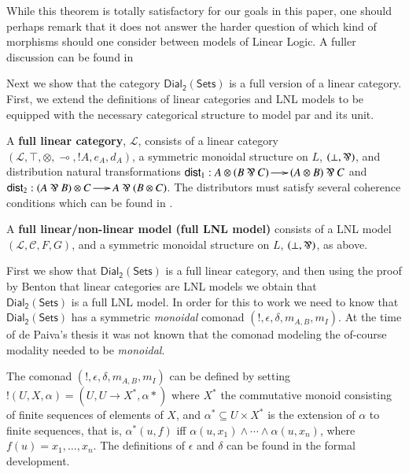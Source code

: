 \documentclass[preprint,12pt]{elsarticle}
\newcommand{\cat}[1]{\mathcal{#1}}
\newcommand{\limp}[0]{\multimap}
\newcommand{\dial}[0]{\mathsf{Dial_2}(\mathsf{Sets})}
\begin{document}
While this theorem is totally satisfactory for our goals in this paper, one should perhaps remark that it does not answer the harder question of which kind of morphisms should one consider between models of Linear Logic. A fuller discussion can be found in %
\iffalse
@article{Maietti:2005,
  title={Relating categorical semantics for intuitionistic linear logic},
  author={Maietti, Maria Emilia and Maneggia, Paola and De Paiva, Valeria and Ritter, Eike},
  journal={Applied Categorical Structures},
  volume={13},
  number={1},
  pages={1--36},
  year={2005},
  publisher={Kluwer Academic Publishers}
}
\fi

Next we show that the category $\dial$ is a full version of a linear
category. First, we extend the definitions of linear categories and
LNL models to be equipped with the necessary categorical structure to
model par and its unit.
\begin{definition}
  \label{def:full-linear-cat}
  A \textbf{full linear category}, $\mathcal{L}$, consists of a linear
  category \\$(\mathcal{L}, \top, \otimes, \limp,!A,e_A,d_A)$, a
  symmetric monoidal structure on $L$, $(\perp, \parr)$, and
  distribution natural transformations $\mathsf{dist}_1 : A \otimes (B
  \parr C) \to (A \otimes B) \parr C$ and $\mathsf{dist}_2 : (A \parr
  B) \otimes C \to A \parr (B \otimes C)$.  The distributors must
  satisfy several coherence conditions which can  be found in
  \cite{Cockett:1997}.
\end{definition}
\begin{definition}
  \label{def:full-lnl-model}
  A \textbf{full linear/non-linear model (full LNL model)} consists of
  a LNL model $(\cat{L}, \cat{C},F,G)$, and a symmetric monoidal
  structure on $L$, $(\perp, \parr)$, as above.
\end{definition}

\noindent
First we show that $\dial$ is a full linear category, and then using
the proof by Benton that linear categories are LNL models we obtain
that \\ $\dial$ is a full LNL model. In order for this to work we
need to know that $\dial$ has a symmetric \textit{monoidal} comonad $(!,
\epsilon, \delta, m_{A,B}, m_I)$.  At the time of de Paiva's
thesis it was not known that the comonad modeling the of-course
modality needed to be \textit{monoidal}.  

The comonad $(!, \epsilon, \delta, m_{A,B}, m_I)$ can be defined by
setting $!(U , X , \alpha) = (U , U \to X^*, \alpha*)$ where $X^*$ the
commutative monoid consisting of finite sequences of elements of $X$,
and $\alpha^* \subseteq U \times X^*$ is the extension of $\alpha$ to
finite sequences, that is, $\alpha^*(u , f)$ iff $\alpha(u , x_1)
\land \cdots \land \alpha(u, x_n)$, where $f(u) = x_1,\ldots,x_n$. The
definitions of $\epsilon$ and $\delta$ can be found in the formal
development.
\end{document}
